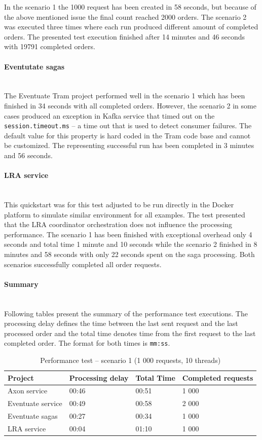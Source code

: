 \documentclass[oneside,
  digital, %
  table,   %
  nolof,     %
  nolot,     %
]{fithesis3}
\newcommand{\newlinepar}[1]{\paragraph{#1}\needspace{4\baselineskip}\mbox{}\\}
\begin{document}
In the scenario 1 the 1000 request has been created in 58 seconds, but because of the above mentioned issue the final count reached 2000 orders. The scenario 2 was executed three times where each run produced different amount of completed orders. The presented test execution finished after 14 minutes and 46 seconds with 19791 completed orders.

\newlinepar{Eventutate sagas}

The Eventuate Tram project performed well in the scenario 1 which has been finished in 34 seconds with all completed orders. However, the scenario 2 in some cases produced an exception in Kafka service that timed out on the \texttt{session.timeout.ms} -- a time out that is used to detect consumer failures. The default value for this property is hard coded in the Tram code base and cannot be customized. The representing successful run has been completed in 3 minutes and 56 seconds.

\newlinepar{LRA service}

This quickstart was for this test adjusted to be run directly in the Docker platform to simulate similar environment for all examples. The test presented that the LRA coordinator orchestration does not influence the processing performance. The scenario 1 has been finished with  exceptional overhead only 4 seconds and total time 1 minute and 10 seconds while the scenario 2 finished in 8 minutes and 58 seconds with only 22 seconds spent on the saga processing. Both scenarios successfully completed all order requests.

\newlinepar{Summary}

Following tables present the summary of the performance test executions. The processing delay defines the time between the last sent request and the last processed order and the total time denotes time from the first request to the last completed order. The format for both times is \texttt{mm:ss}.

\begin{table}[h]
    \begin{tabularx}{\textwidth}{lXXX}
        \toprule
        Project & Processing delay & Total Time & Completed requests \\
        \midrule
        Axon service & 00:46 & 00:51 & 1 000 \\
        Eventuate service & 00:49 & 00:58 & 2 000 \\
        Eventuate sagas & 00:27 & 00:34 & 1 000 \\
        LRA service & 00:04 & 01:10 & 1 000 \\
        \bottomrule
    \end{tabularx}
    \caption{Performance test -- scenario 1 (1 000 requests, 10 threads)}
    \label{tab:performance-scenario-1}
\end{table}
\end{document}
